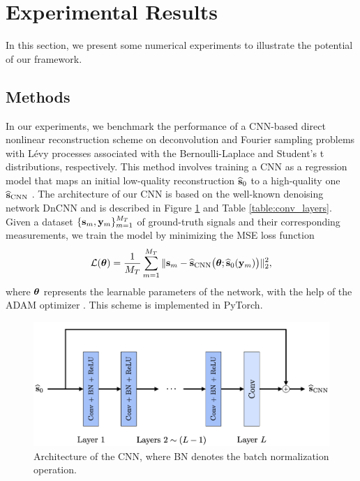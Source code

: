 \documentclass[journal]{IEEEtran}
\begin{document}
\section{Experimental Results}
In this section, we present some numerical experiments to illustrate the potential of our framework.

\subsection{Methods}
In our experiments, we benchmark the performance of a CNN-based direct nonlinear reconstruction scheme on deconvolution and Fourier sampling problems with L\'{e}vy processes associated with the Bernoulli-Laplace and Student's t distributions, respectively. This method involves training a CNN as a regression model that maps an initial low-quality reconstruction $\widehat{{\bf{s}}}_{0}$ to a high-quality one $\widehat{{\bf{s}}}_{\text{CNN}}$ \cite{jin2017deep,chen2017low,hyun2018deep, monakhova2019learned,perdios2020cnn}. The architecture of our CNN is based on the well-known denoising network DnCNN \cite{zhang2017beyond} and is described in Figure \ref{fig:CNN_architecture} and Table \ref{table:conv_layers}. Given a dataset $\{{\bf{s}}_{m}, {\bf{y}}_m\}_{m=1}^{M_T}$ of ground-truth signals and their corresponding measurements, we train the model by minimizing the MSE loss function 
\begin{equation}
    \mathcal{L}({\boldsymbol{\theta}}) = \frac{1}{M_T} \sum_{m=1}^{M_T} \|{\bf{s}}_{m} - \widehat{{\bf{s}}}_{\text{CNN}}\big({\boldsymbol{\theta}}; \widehat{{\bf{s}}}_{0}({\bf{y}}_m)\big) \|_{2}^{2},
\end{equation}
where ${\boldsymbol{\theta}}$ represents the learnable parameters of the network, with the help of the ADAM optimizer \cite{kingma2014adam}. This scheme is implemented in PyTorch.

\begin{figure}[t]
    \centering
    \includegraphics[width=\linewidth]{figures/cnn_architecture.png}
    \caption{Architecture of the CNN, where BN denotes the batch normalization operation.}
    \label{fig:CNN_architecture}
\end{figure}
        
\end{document}
